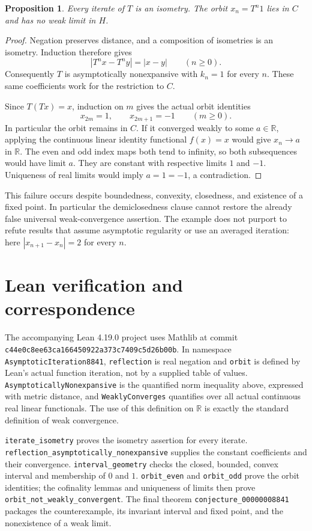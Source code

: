 \documentclass[11pt]{article}
\newtheorem{proposition}{Proposition}
\begin{document}
\begin{proposition}
Every iterate of $T$ is an isometry. The orbit $x_n=T^n1$ lies in $C$
and has no weak limit in $H$.
\end{proposition}
\begin{proof}
Negation preserves distance, and a composition of isometries is an
isometry. Induction therefore gives
\[
 |T^n x-T^n y|=|x-y| \qquad(n\geq0).
\]
Consequently $T$ is asymptotically nonexpansive with $k_n=1$ for every
$n$. These same coefficients work for the restriction to $C$.

Since $T(Tx)=x$, induction on $m$ gives the actual orbit identities
\[
 x_{2m}=1,\qquad x_{2m+1}=-1\qquad(m\geq0).
\]
In particular the orbit remains in $C$. If it converged weakly to some
$a\in\mathbb R$, applying the continuous linear identity functional
$f(x)=x$ would give $x_n\to a$ in $\mathbb R$. The even and odd
index maps both tend to infinity, so both subsequences would have limit
$a$. They are constant with respective limits $1$ and $-1$.
Uniqueness of real limits would imply $a=1=-1$, a contradiction.
\end{proof}

This failure occurs despite boundedness, convexity, closedness, and
existence of a fixed point. In particular the demiclosedness clause
cannot restore the already false universal weak-convergence assertion.
The example does not purport to refute results that assume asymptotic
regularity or use an averaged iteration: here
$|x_{n+1}-x_n|=2$ for every $n$.

\section{Lean verification and correspondence}
\raggedright
The accompanying Lean 4.19.0 project uses Mathlib at commit
\texttt{c44e0c8ee63ca166450922a373c7409c5d26b00b}.
In namespace \texttt{AsymptoticIteration8841},
\texttt{reflection} is real negation and \texttt{orbit} is defined by
Lean's actual function iteration, not by a supplied table of values.
\texttt{AsymptoticallyNonexpansive} is the quantified norm inequality
above, expressed with metric distance, and
\texttt{WeaklyConverges} quantifies over all actual continuous real
linear functionals. The use of this definition on $\mathbb R$ is
exactly the standard definition of weak convergence.

\texttt{iterate\_isometry} proves the isometry assertion for every
iterate. \texttt{reflection\_asymptotically\_nonexpansive} supplies
the constant coefficients and their convergence.
\texttt{interval\_geometry} checks the closed, bounded, convex
interval and membership of $0$ and $1$.
\texttt{orbit\_even} and \texttt{orbit\_odd} prove the orbit identities;
the cofinality lemmas and uniqueness of limits then prove
\texttt{orbit\_not\_weakly\_convergent}.
The final theorem \texttt{conjecture\_00000008841} packages the
counterexample, its invariant interval and fixed point, and the
nonexistence of a weak limit.
\end{document}
